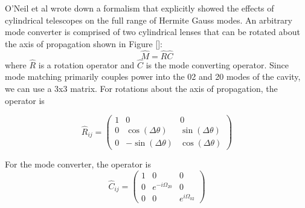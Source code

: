 O'Neil et al \cite{ONeilModeTransform} wrote down a formalism that explicitly showed the effects of cylindrical telescopes on the full range of Hermite Gauss modes. An arbitrary mode converter is comprised of two cylindrical lenses that can be rotated about the axis of propagation shown in Figure []:
	\begin{equation}
	\hat{M} = \hat{R} \hat{C}
	\end{equation} 
where $\hat{R}$ is a rotation operator and $\hat{C}$ is the mode converting operator.  Since mode matching primarily couples power into the 02 and 20 modes of the cavity, we can use a 3x3 matrix.  For rotations about the axis of propagation, the operator is

\begin{equation} \label{rotation}
\hat{R}_{ij} = 
\begin{pmatrix}
1		&0										& 0 
\\ 	0		&\cos(\Delta \theta)						&\sin(\Delta \theta)
\\ 	0		&-\sin(\Delta \theta)						&\cos(\Delta \theta)			

\end{pmatrix}
\end{equation}

For the mode converter, the operator is
\begin{equation} \label{convert}
\hat{C}_{ij} = 
\begin{pmatrix}
1			&0						& 0 
\\ 	0			&e^{-i \Omega_{20}}		& 0
\\ 	0			&0						&e^{i \Omega_{02}}			

\end{pmatrix}
\end{equation}

